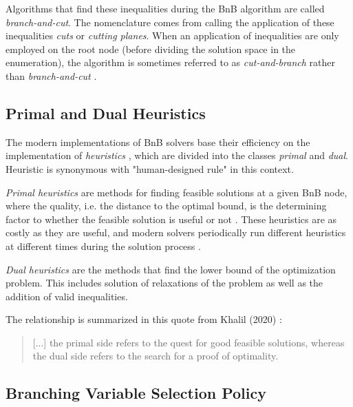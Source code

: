 Algorithms that find these inequalities during the \gls{BnB} algorithm are called \textit{branch-and-cut}. The nomenclature comes from calling the application of these inequalities \textit{cuts} or \textit{cutting planes}.
When an application of inequalities are only employed on the root node (before dividing the solution space in the enumeration), the algorithm is sometimes referred to as \textit{cut-and-branch} rather than \textit{branch-and-cut} \cite{wolsey2020integer}.






\subsection{Primal and Dual Heuristics}

The modern implementations of \gls{BnB} solvers base their efficiency on the implementation of \textit{heuristics} \cite{khalil2020towards}, which are divided into the classes \textit{primal} and \textit{dual}. Heuristic is synonymous with "human-designed rule" in this context.

\textit{Primal heuristics} are methods for finding feasible solutions at a given \gls{BnB} node, where the quality, i.e. the distance to the optimal bound, is the determining factor to whether the feasible solution is useful or not \cite{khalil2020towards}. These heuristics are as costly as they are useful, and modern solvers periodically run different heuristics at different times during the solution process \cite{khalil2020towards}.

\textit{Dual heuristics} are the methods that find the lower bound of the optimization problem. This includes solution of relaxations of the problem as well as the addition of valid inequalities. 

The relationship is summarized in this quote from Khalil (2020) \cite{khalil2020towards}:
\begin{quote}
    [...] the
primal side refers to the quest for good feasible solutions, whereas the dual side refers to
the search for a proof of optimality.
\end{quote}






\subsection{Branching Variable Selection Policy}\label{ssec:branchingpolicy}

